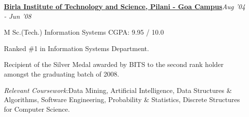 \documentclass[10pt]{article}
\newenvironment{innerlist}[1][\enskip\textbullet]%
        {\begin{compactitem}[#1]}{\end{compactitem}}
\begin{document}
\href{http://www.bits-goa.ac.in/}{\textbf{Birla Institute of Technology and Science, Pilani - Goa Campus}}\hfill \textit{Aug '04 - Jun '08}
\begin{innerlist}
\item[] M Sc.(Tech.) {Information Systems} \hfill{CGPA: 9.95 / 10.0}
        \begin{innerlist}
        \item Ranked \#1 in Information Systems Department.
        \item Recipient of the Silver Medal awarded by BITS to the second rank holder amongst the graduating batch of 2008.
        \item \emph{Relevant Coursework:}Data Mining, Artificial Intelligence, Data Structures \& Algorithms, Software Engineering, Probability \& Statistics, Discrete Structures for Computer Science.
        \end{innerlist}
\end{innerlist}
\end{document}
